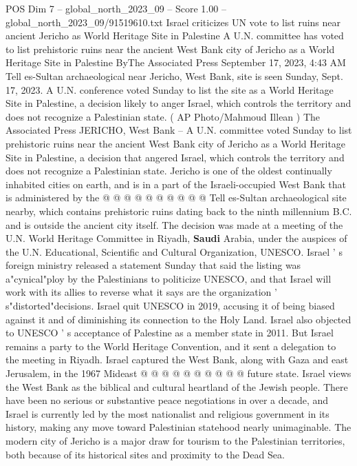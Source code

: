 \begin{textsample}{POS Dim 7 – global\_north\_2023\_09 – Score 1.00 – global\_north\_2023\_09/91519610.txt}  \label{ex:f7_pos_285}
Israel criticizes UN vote to list ruins near ancient Jericho as World Heritage Site in Palestine A U.N. committee has voted to list prehistoric ruins near the ancient West Bank city of Jericho as a World Heritage Site in Palestine ByThe Associated Press September 17, 2023, 4:43 AM Tell es-Sultan archaeological near Jericho, West Bank, site is seen Sunday, Sept. 17, 2023.
A U.N. conference voted Sunday to list the site as a World Heritage Site in Palestine, a decision likely to anger Israel, which controls the territory and does not recognize a Palestinian state. ( AP Photo/Mahmoud Illean ) The Associated Press JERICHO, West Bank -- A U.N. committee voted Sunday to list prehistoric ruins near the ancient West Bank city of Jericho as a World Heritage Site in Palestine, a decision that angered Israel, which controls the territory and does not recognize a Palestinian state.
Jericho is one of the oldest continually inhabited cities on earth, and is in a part of the Israeli-occupied West Bank that is administered by the @ @ @ @ @ @ @ @ @ @ Tell es-Sultan archaeological site nearby, which contains prehistoric ruins dating back to the ninth millennium B.C. and is outside the ancient city itself.
The decision was made at a meeting of the U.N.
World Heritage Committee in Riyadh, \textbf{Saudi} Arabia, under the auspices of the U.N.
Educational, Scientific and Cultural Organization, UNESCO.
Israel ' s foreign ministry released a statement Sunday that said the listing was a"cynical"ploy by the Palestinians to politicize UNESCO, and that Israel will work with its allies to reverse what it says are the organization ' s"distorted"decisions.
Israel quit UNESCO in 2019, accusing it of being biased against it and of diminishing its connection to the Holy Land.
Israel also objected to UNESCO ' s acceptance of Palestine as a member state in 2011.
But Israel remains a party to the World Heritage Convention, and it sent a delegation to the meeting in Riyadh.
Israel captured the West Bank, along with Gaza and east Jerusalem, in the 1967 Mideast @ @ @ @ @ @ @ @ @ @ future state.
Israel views the West Bank as the biblical and cultural heartland of the Jewish people.
There have been no serious or substantive peace negotiations in over a decade, and Israel is currently led by the most nationalist and religious government in its history, making any move toward Palestinian statehood nearly unimaginable.
The modern city of Jericho is a major draw for tourism to the Palestinian territories, both because of its historical sites and proximity to the Dead Sea.

\end{textsample}
